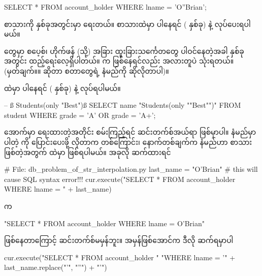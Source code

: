 %
\begin{sql}
SELECT * FROM account_holder WHERE lname = 'O''Brian';
\end{sql}
%
စာသားကို  နှစ်ခုအတွင်းမှာ ရေးတယ်။ စာသားထဲမှာ  ပါနေရင်  ( နှစ်ခု) နဲ့  လုပ်ပေးရပါမယ်။ 

 တွေမှာ စပေ့စ်၊ ဟိုက်ဖန် (သို့) အခြား ထူးခြားသင်္ကေတတွေ ပါဝင်နေတဲ့အခါ    နှစ်ခုအတွင်း ထည့်ရေးလေ့ရှိပါတယ်။  က  ဖြစ်နေရင်လည်း အလားတူပဲ  သုံးရတယ်။ (မှတ်ချက်။\qquad ။  ဆိုတာ  စတာတွေရဲ့ နံမည်ကို ဆိုလိုတာပါ)။

%
%
 ထဲမှာ  ပါနေရင်  ( နှစ်ခု) နဲ့  လုပ်ရပါမယ်။
%
\begin{sql}
-- ß Students(only "Best")ß
SELECT name "Students(only ""Best"")" FROM student 
WHERE grade = 'A' OR grade = 'A+';
\end{sql}
%

အောက်မှာ ရေးထားတဲ့အတိုင်း စမ်းကြည့်ရင်  ဆင်းတက်စ်အယ်ရာ ဖြစ်မှာပါ။ နံမည်မှာပါတဲ့  ကို  ပြောင်းပေးဖို့ လိုတာက တစ်ကြောင်း၊ နောက်တစ်ချက်က နံမည်ဟာ စာသားဖြစ်တဲ့အတွက်  ထဲမှာ  ဖြစ်ရပါမယ်။ အခုလို ဆက်ထားရင်
%
\begin{py}
# File: db_problem_of_str_interpolation.py
last_name = "O'Brian"
# this will cause SQL syntax error!!!
cur.execute("SELECT * FROM account_holder WHERE lname = " + last_name)
\end{py}
%
 က 
%
\begin{py}
"SELECT * FROM account_holder WHERE lname = O'Brian"
\end{py}
%
ဖြစ်နေတာကြောင့် ဆင်းတက်စ်မမှန်ဘူး။ အမှန်ဖြစ်အောင်က ဒီလို ဆက်ရမှာပါ

%
\begin{py}
cur.execute("SELECT * FROM account_holder "
            "WHERE lname = '" + last_name.replace("'", "''") + "'")
\end{py}
%

